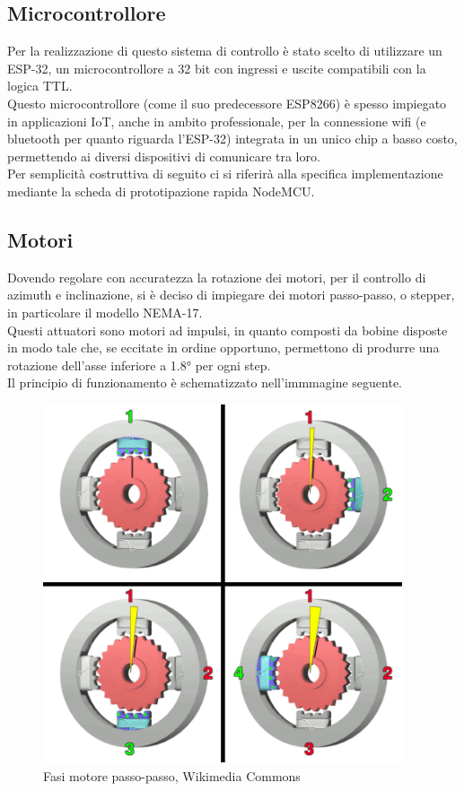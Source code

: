 \documentclass[12pt]{article}
\begin{document}
    \subsection{Microcontrollore}
    Per la realizzazione di questo sistema di controllo è stato scelto di utilizzare un ESP-32, un microcontrollore a 32 bit con ingressi e uscite compatibili con la logica TTL.\\
    Questo microcontrollore (come il suo predecessore ESP8266) è spesso impiegato in applicazioni IoT, anche in ambito professionale, per la connessione wifi (e bluetooth per quanto riguarda l'ESP-32) integrata in un unico chip a basso costo, permettendo ai diversi dispositivi di comunicare tra loro.\\
    Per semplicità costruttiva di seguito ci si riferirà alla specifica implementazione me\-dian\-te la scheda di prototipazione rapida NodeMCU.
    
    \subsection{Motori}
    Dovendo regolare con accuratezza la rotazione dei motori, per il controllo di azimuth e inclinazione, si è deciso di impiegare dei motori passo-passo, o stepper, in particolare il modello NEMA-17.\\
    Questi attuatori sono motori ad impulsi, in quanto composti da bobine disposte in modo tale che, se eccitate in ordine opportuno, permettono di produrre una rotazione dell'asse inferiore a 1.8° per ogni step.\\
    Il principio di funzionamento è schematizzato nell'immmagine seguente.\\
    
    
    
    \begin{figure}[h]
    \centering
        \includegraphics[width=300pt]{Draws/Animations/StepperMotor.png}
        \caption{Fasi motore passo-passo, Wikimedia Commons \protect\footnotemark}
    \end{figure}
    
\end{document}
